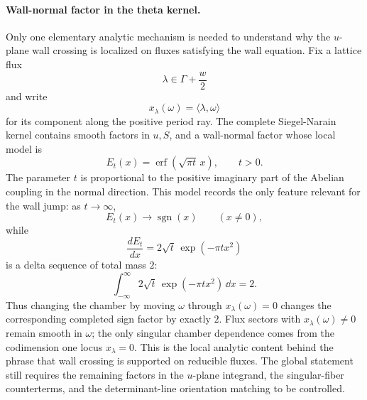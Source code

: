 \paragraph{Wall-normal factor in the theta kernel.}
Only one elementary analytic mechanism is needed to understand why the
\(u\)-plane wall crossing is localized on fluxes satisfying the wall
equation.  Fix a lattice flux
\[
  \lambda\in\Gamma+\frac{w}{2}
\]
and write
\[
  x_\lambda(\omega)=\langle\lambda,\omega\rangle
\]
for its component along the positive period ray.  The complete
Siegel-Narain kernel contains smooth factors in \(u,S\), and a wall-normal
factor whose local model is
\begin{equation}
  E_t(x)=\operatorname{erf}(\sqrt{\pi t}\,x),
  \qquad t>0.
  \label{eq:u-plane-wall-normal-erf}
\end{equation}
The parameter \(t\) is proportional to the positive imaginary part of the
Abelian coupling in the normal direction.  This model records the only
feature relevant for the wall jump: as \(t\to\infty\),
\[
  E_t(x)\to \operatorname{sgn}(x)
  \qquad(x\ne0),
\]
while
\begin{equation}
  \frac{dE_t}{dx}
  =
  2\sqrt t\,\exp(-\pi t x^2)
  \label{eq:u-plane-wall-normal-delta-sequence}
\end{equation}
is a delta sequence of total mass \(2\):
\[
  \int_{-\infty}^{\infty}2\sqrt t\,\exp(-\pi t x^2)\,\dd x=2.
\]
Thus changing the chamber by moving \(\omega\) through
\(x_\lambda(\omega)=0\) changes the corresponding completed sign factor by
exactly \(2\).  Flux sectors with \(x_\lambda(\omega)\ne0\) remain smooth in
\(\omega\); the only singular chamber dependence comes from the codimension
one locus \(x_\lambda=0\).  This is the local analytic content behind the
phrase that wall crossing is supported on reducible fluxes.  The global
statement still requires the remaining factors in the \(u\)-plane integrand,
the singular-fiber counterterms, and the determinant-line orientation
matching to be controlled.

